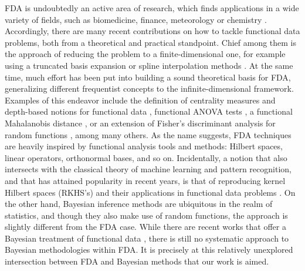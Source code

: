 \documentclass{article}
\numberwithin{equation}{section}
\theoremstyle{plain}
\theoremstyle{definition}
\begin{document}
FDA is undoubtedly an active area of research, which finds applications in a wide variety of fields, such as biomedicine, finance, meteorology or chemistry \citep{ullah2013applications}. Accordingly, there are many recent contributions on how to tackle functional data problems, both from a theoretical and practical standpoint. Chief among them is the approach of reducing the problem to a finite-dimensional one, for example using a truncated basis expansion or spline interpolation methods \citep{muller2005generalized, aguilera2013comparative}. At the same time, much effort has been put into building a sound theoretical basis for FDA, generalizing different frequentist concepts to the infinite-dimensional framework. Examples of this endeavor include the definition of centrality measures and depth-based notions for functional data \citep{lopez2009concept}, functional ANOVA tests \citep{cuevas2004anova}, a functional Mahalanobis distance \citep{galeano2015mahalanobis, berrendero2020mahalanobis}, or an extension of Fisher's discriminant analysis for random functions \citep{shin2008extension}, among many others. As the name suggests, FDA techniques are heavily inspired by functional analysis tools and methods: Hilbert spaces, linear operators, orthonormal bases, and so on. Incidentally, a notion that also intersects with the classical theory of machine learning and pattern recognition, and that has attained popularity in recent years, is that of reproducing kernel Hilbert spaces (RKHS's) and their applications in functional data problems \citep{kupresanin2010rkhs, yuan2010reproducing, berrendero2018use}. On the other hand, Bayesian inference methods are ubiquitous in the realm of statistics, and though they also make use of random functions, the approach is slightly different from the FDA case. While there are recent works that offer a Bayesian treatment of functional data \citep[e.g.][]{crainiceanu2010bayesian, shi2011gaussian}, there is still no systematic approach to Bayesian methodologies within FDA. It is precisely at this relatively unexplored intersection between FDA and Bayesian methods that our work is aimed.
\end{document}
